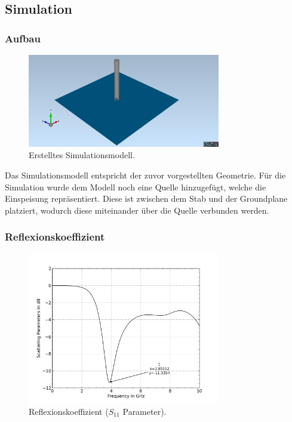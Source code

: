 \subsection{Simulation}

\subsubsection{Aufbau}

\begin{figure}[h!]
	\centering
	\includegraphics[width=0.75\textwidth]{../fig/plt/monopol_a_sim_3d_model.png}
	\caption{Erstelltes Simulationsmodell.}
\end{figure}

Das Simulationsmodell entspricht der zuvor vorgestellten Geometrie.
Für die Simulation wurde dem Modell noch eine Quelle hinzugefügt,
welche die Einspeisung repräsentiert. Diese ist zwischen dem
Stab und der Groundplane platziert, wodurch diese miteinander
über die Quelle verbunden werden.

\newpage
\subsubsection{Reflexionskoeffizient}

\begin{figure}[h!]
	\centering
	\includegraphics[width=0.75\textwidth]{../fig/plt/monopol_a_sim_s11.png}
	\caption{Reflexionskoeffizient ($S_{11}$ Parameter).}
\end{figure}

